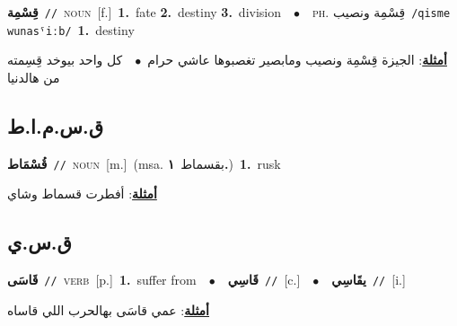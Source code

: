 \documentclass[10pt,a4paper,twoside]{article} %
\begin{document}
\begin{multicols}{2}
{\setlength\topsep{0pt}\textbf{\foreignlanguage{arabic}{قِسْمِة}}\ {\color{gray}\texttt{//}\color{black}}\ \textsc{noun}\ [f.]\ \textbf{1.}~fate  \textbf{2.}~destiny  \textbf{3.}~division\ \ $\bullet$\ \ \textsc{ph.} \color{gray} \foreignlanguage{arabic}{قِسْمِة ونصيب}\color{black}\ {\color{gray}\texttt{/{\sffamily qisme wunasˤiːb}/}\color{black}}\ \textbf{1.}~destiny\  \begin{flushright}\color{gray}\foreignlanguage{arabic}{\textbf{\underline{\foreignlanguage{arabic}{أمثلة}}}: الجيزة قِسْمِة ونصيب ومابصير تغصبوها عاشي حرام\ $\bullet$\ \  كل واحد بيوخد قِسِمته من هالدنيا}\end{flushright}\color{black}} \vspace{2mm}

\vspace{-3mm}
\subsection*{\color{blue}\foreignlanguage{arabic}{ق.س.م.ا.ط}\color{blue}{ (ntws)}} 

{\setlength\topsep{0pt}\textbf{\foreignlanguage{arabic}{قُسْمَاط}}\ {\color{gray}\texttt{//}\color{black}}\ \textsc{noun}\ [m.]\ \color{gray}(msa. \foreignlanguage{arabic}{بقسماط}~\foreignlanguage{arabic}{\textbf{١.}})\color{black}\ \textbf{1.}~rusk\  \begin{flushright}\color{gray}\foreignlanguage{arabic}{\textbf{\underline{\foreignlanguage{arabic}{أمثلة}}}: أفطرت قسماط وشاي}\end{flushright}\color{black}} \vspace{2mm}

\vspace{-3mm}
\subsection*{\color{blue}\foreignlanguage{arabic}{ق.س.ي}\color{blue}{}} 

{\setlength\topsep{0pt}\textbf{\foreignlanguage{arabic}{قَاسَى}}\ {\color{gray}\texttt{//}\color{black}}\ \textsc{verb}\ [p.]\ \textbf{1.}~suffer from\ \ $\bullet$\ \ \setlength\topsep{0pt}\textbf{\foreignlanguage{arabic}{قَاسِي}}\ {\color{gray}\texttt{//}\color{black}}\ [c.]\ \ $\bullet$\ \ \setlength\topsep{0pt}\textbf{\foreignlanguage{arabic}{يقَاسِي}}\ {\color{gray}\texttt{//}\color{black}}\ [i.]\  \begin{flushright}\color{gray}\foreignlanguage{arabic}{\textbf{\underline{\foreignlanguage{arabic}{أمثلة}}}: عمي قاسَى بهالحرب اللي قاساه}\end{flushright}\color{black}} \vspace{2mm}


\end{multicols}
\end{document}
